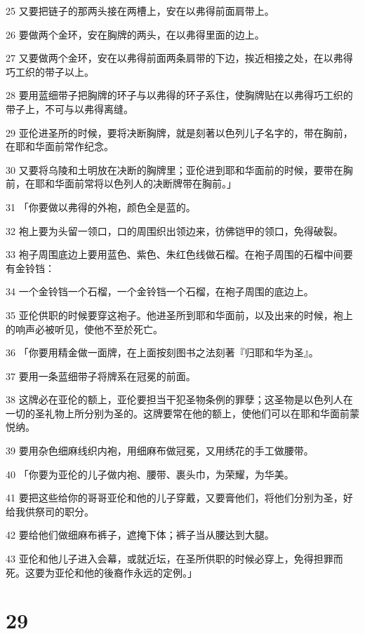 \par 25 又要把链子的那两头接在两槽上，安在以弗得前面肩带上。
\par 26 要做两个金环，安在胸牌的两头，在以弗得里面的边上。
\par 27 又要做两个金环，安在以弗得前面两条肩带的下边，挨近相接之处，在以弗得巧工织的带子以上。
\par 28 要用蓝细带子把胸牌的环子与以弗得的环子系住，使胸牌贴在以弗得巧工织的带子上，不可与以弗得离缝。
\par 29 亚伦进圣所的时候，要将决断胸牌，就是刻著以色列儿子名字的，带在胸前，在耶和华面前常作纪念。
\par 30 又要将乌陵和土明放在决断的胸牌里；亚伦进到耶和华面前的时候，要带在胸前，在耶和华面前常将以色列人的决断牌带在胸前。」
\par 31 「你要做以弗得的外袍，颜色全是蓝的。
\par 32 袍上要为头留一领口，口的周围织出领边来，彷佛铠甲的领口，免得破裂。
\par 33 袍子周围底边上要用蓝色、紫色、朱红色线做石榴。在袍子周围的石榴中间要有金铃铛：
\par 34 一个金铃铛一个石榴，一个金铃铛一个石榴，在袍子周围的底边上。
\par 35 亚伦供职的时候要穿这袍子。他进圣所到耶和华面前，以及出来的时候，袍上的响声必被听见，使他不至於死亡。
\par 36 「你要用精金做一面牌，在上面按刻图书之法刻著『归耶和华为圣』。
\par 37 要用一条蓝细带子将牌系在冠冕的前面。
\par 38 这牌必在亚伦的额上，亚伦要担当干犯圣物条例的罪孽；这圣物是以色列人在一切的圣礼物上所分别为圣的。这牌要常在他的额上，使他们可以在耶和华面前蒙悦纳。
\par 39 要用杂色细麻线织内袍，用细麻布做冠冕，又用绣花的手工做腰带。
\par 40 「你要为亚伦的儿子做内袍、腰带、裹头巾，为荣耀，为华美。
\par 41 要把这些给你的哥哥亚伦和他的儿子穿戴，又要膏他们，将他们分别为圣，好给我供祭司的职分。
\par 42 要给他们做细麻布裤子，遮掩下体；裤子当从腰达到大腿。
\par 43 亚伦和他儿子进入会幕，或就近坛，在圣所供职的时候必穿上，免得担罪而死。这要为亚伦和他的後裔作永远的定例。」

\chapter{29}

